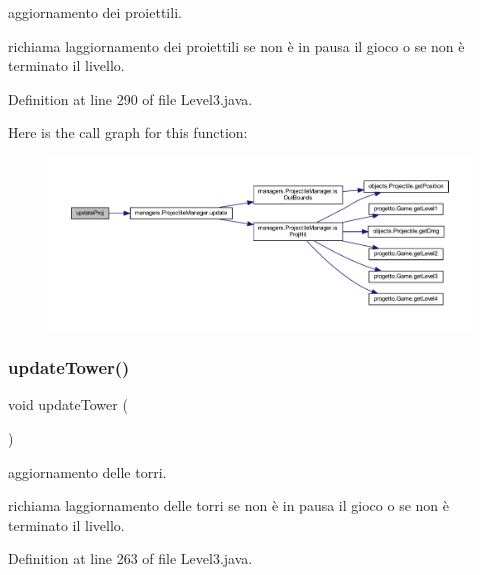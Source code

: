 aggiornamento dei proiettili. 

richiama l\textquotesingle{}aggiornamento dei proiettili se non è in pausa il gioco o se non è terminato il livello. 

Definition at line 290 of file Level3.\+java.

Here is the call graph for this function\+:\nopagebreak
\begin{figure}[H]
\begin{center}
\leavevmode
\includegraphics[width=350pt]{classscenes_1_1_level3_ac83c203b559f6fd0bb225744d7ccf854_cgraph}
\end{center}
\end{figure}
\mbox{\label{classscenes_1_1_level3_ae4fd4a959e4d782a5e7ac0eff77ba27f}} 
\subsubsection{\texorpdfstring{update\+Tower()}{updateTower()}}
{\footnotesize\ttfamily void update\+Tower (\begin{DoxyParamCaption}{ }\end{DoxyParamCaption})}



aggiornamento delle torri. 

richiama l\textquotesingle{}aggiornamento delle torri se non è in pausa il gioco o se non è terminato il livello. 

Definition at line 263 of file Level3.\+java.

